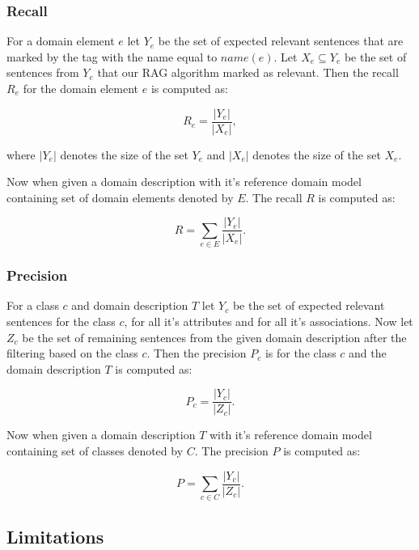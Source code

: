\subsubsection{Recall}

For a domain element $e$ let $Y_e$ be the set of expected relevant sentences that are marked by the tag with the name equal to $name(e)$. Let $X_e \subseteq Y_e$ be the set of sentences from $Y_e$ that our RAG algorithm marked as relevant. Then the recall $R_e$ for the domain element $e$ is computed as:

\[ R_e = \dfrac{|Y_e|}{|X_e|}, \]

\noindent{}where $|Y_e|$ denotes the size of the set $Y_e$ and $|X_e|$ denotes the size of the set $X_e$.

Now when given a domain description with it's reference domain model containing set of domain elements denoted by $E$. The recall $R$ is computed as:

\[ R = \sum_{e \in E} \dfrac{|Y_e|}{|X_e|}. \]


\subsubsection{Precision}

For a class $c$ and domain description $T$ let $Y_c$ be the set of expected relevant sentences for the class $c$, for all it's attributes and for all it's associations. Now let $Z_c$ be the set of remaining sentences from the given domain description after the filtering based on the class $c$. Then the precision $P_c$ is for the class $c$ and the domain description $T$ is computed as:

\[ P_c = \dfrac{|Y_c|}{|Z_c|}. \]

Now when given a domain description $T$ with it's reference domain model containing set of classes denoted by $C$. The precision $P$ is computed as:

\[ P = \sum_{c \in C}\dfrac{|Y_c|}{|Z_c|}. \]






\subsection{Limitations}

